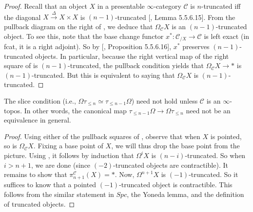 \begin{proof}
    Recall that an object $X$ in a presentable $\infty$-category $\mathcal{C}$ is $n$-truncated iff the diagonal $X\xrightarrow{\Delta}X\times X$ is $(n-1)$-truncated [\cite{lurie2009higher}, Lemma 5.5.6.15]. From the pullback diagram on the right of , we deduce that $\Omega_{\mathcal{C}}X$ is an $(n-1)$-truncated object. To see this, note that the base change functor $x^*: \mathcal{C}_{/X}\to \mathcal{C}$ is left exact (in fcat, it is a right adjoint). So by [\cite{lurie2009higher}, Proposition 5.5.6.16], $x^*$ preserves $(n-1)$-truncated objects. In particular, because the right vertical map of the right square of  is $(n-1)$-truncated, the pullback condition yields that $\Omega_{\mathcal{C}}X\to *$ is $(n-1)$-truncated. But this is equivalent to saying that $\Omega_\mathcal{C}X$ is $(n-1)$-truncated. 
\end{proof}
\begin{rem}
    The slice condition (i.e., $\Omega \tau_{\leq n}\simeq \tau_{\leq n-1}\Omega$) need not hold unless $\mathcal{C}$ is an $\infty$-topos. In other words, the canonical map $\tau_{\leq n-1}\Omega \to \Omega\tau_{\leq n}$ need not be an equivalence in general. 
\end{rem}
\begin{proof}
 Using either of the pullback squares of , observe that when $X$ is pointed, so is $\Omega_{\mathcal{C}}X$. Fixing a base point of $X$, we will thus drop the base point from the picture. Using , it follows by induction that $\Omega^{i}X$ is $(n-i)$-truncated. So when $i>n+1$, we are done (since $(-2)$-truncated objects are contractible). It remains to show that $\pi_{n+1}^\mathcal{C}(X)=*$. Now, $\Omega^{n+1}X$ is $(-1)$-truncated. So it suffices to know that a pointed $(-1)$-truncated object is contractible. This follows from the similar statement in $Spc$, the Yoneda lemma, and the definition of truncated objects.
 \end{proof} 
